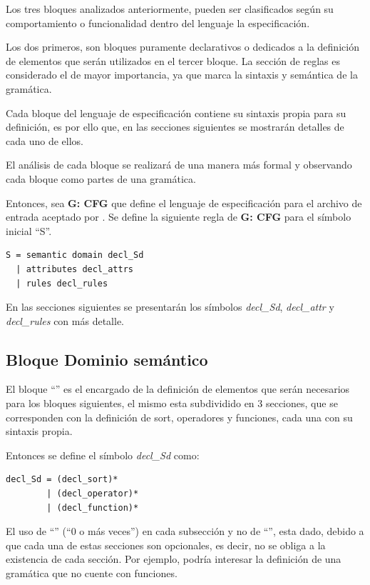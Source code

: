 Los tres bloques analizados anteriormente, pueden ser clasificados según su comportamiento o funcionalidad dentro del lenguaje la especificación.

Los dos primeros, son bloques puramente declarativos o dedicados a la definición de elementos que serán utilizados en el tercer bloque. La sección de reglas es considerado el de mayor importancia, ya que marca la sintaxis y semántica de la gramática.

Cada bloque del lenguaje de especificación contiene su sintaxis propia para su definición, es por ello que, en las secciones siguientes se mostrarán detalles de cada uno de ellos.

El análisis de cada bloque se realizará de una manera más formal y observando cada bloque como partes de una gramática.

Entonces, sea \textbf{G: CFG} que define el lenguaje de especificación para el archivo de entrada aceptado por \maggen. Se define la siguiente regla de \textbf{G: CFG} para el símbolo inicial ``S''.

\begin{lstlisting}[frame=shadowbox, language=specmag, linewidth=8cm]
S = semantic domain decl_Sd
  | attributes decl_attrs
  | rules decl_rules
\end{lstlisting}

En las secciones siguientes se presentarán los símbolos \textit{decl\_Sd}, \textit{decl\_attr} y \textit{decl\_rules} con más detalle.  

\subsection{Bloque Dominio semántico}
\label{subsec:bloq-sem}
El bloque ``'' es el encargado de la definición de elementos que serán necesarios para los bloques siguientes, el mismo esta subdividido en 3 secciones, que se corresponden con la definición de sort, operadores y funciones, cada una con su sintaxis propia. 

Entonces se define el símbolo \textit{decl\_Sd} como:

\begin{lstlisting}[frame=shadowbox, language=specmag, linewidth=8cm]
decl_Sd = (decl_sort)*
        | (decl_operator)*
        | (decl_function)*
\end{lstlisting}

El uso de ``\textbtt{*}'' (``0 o más veces'') en cada subsección y no de ``\textbtt{+}'', esta dado, debido a que cada una de estas secciones son opcionales, es decir, no se obliga a la existencia de cada sección. Por ejemplo, podría interesar la definición de una gramática que no cuente con funciones.

